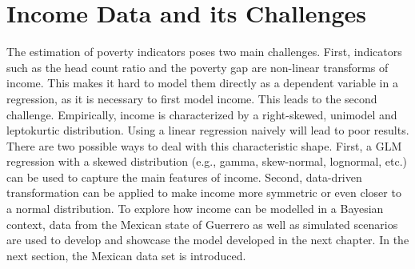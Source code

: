 \chapter{Income Data and its Challenges}

The estimation of poverty indicators poses two main challenges.
First, indicators such as the head count ratio and the poverty gap are non-linear transforms of income.
This makes it hard to model them directly as a dependent variable in a regression, as it is necessary to first model income.
This leads to the second challenge.
Empirically, income is characterized by a right-skewed, unimodel and leptokurtic distribution.
Using a linear regression naively will lead to poor results.
There are two possible ways to deal with this characteristic shape.
First, a GLM regression with a skewed distribution (e.g., gamma, skew-normal, lognormal, etc.) can be used to capture the main features of income.
Second, data-driven transformation can be applied to make income more symmetric or even closer to a normal distribution.
To explore how income can be modelled in a Bayesian context, data from the Mexican state of Guerrero as well as simulated scenarios are used to develop and showcase the model developed in the next chapter.
In the next section, the Mexican data set is introduced.


